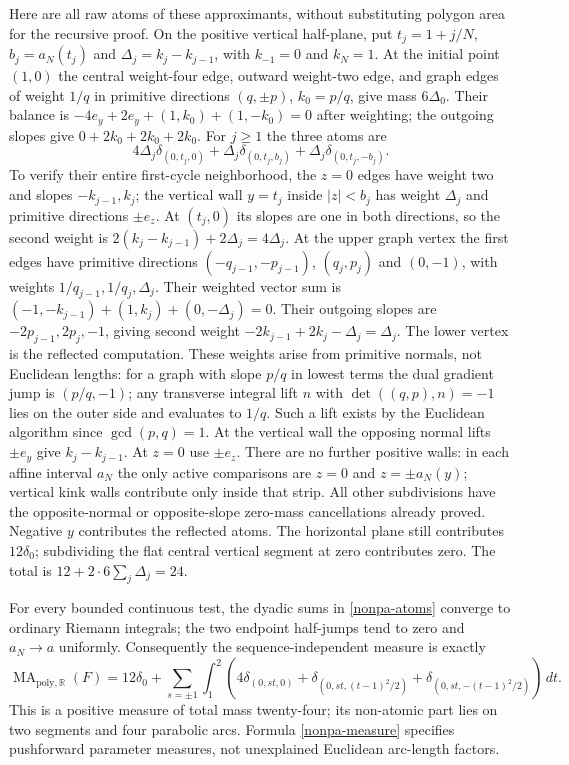 \documentclass[11pt]{article}
\newcommand{\R}{\mathbb R}
\begin{document}
Here are all raw atoms of these approximants, without substituting
polygon area for the recursive proof. On the positive vertical half-plane,
put $t_j=1+j/N$, $b_j=a_N(t_j)$ and $\Delta_j=k_j-k_{j-1}$, with
$k_{-1}=0$ and $k_N=1$.
At the initial point $(1,0)$ the central weight-four edge, outward
weight-two edge, and graph edges of weight $1/q$ in primitive directions
$(q,\pm p)$, $k_0=p/q$, give mass $6\Delta_0$.
Their balance is $-4e_y+2e_y+(1,k_0)+(1,-k_0)=0$ after weighting;
the outgoing slopes give $0+2k_0+2k_0+2k_0$.
For $j\geq1$ the three atoms are
\begin{equation}\label{nonpa-atoms}
 4\Delta_j\delta_{(0,t_j,0)}+
 \Delta_j\delta_{(0,t_j,b_j)}+
 \Delta_j\delta_{(0,t_j,-b_j)}.
\end{equation}
To verify their entire first-cycle neighborhood, the $z=0$ edges have
weight two and slopes $-k_{j-1},k_j$; the vertical wall $y=t_j$ inside
$|z|<b_j$ has weight $\Delta_j$ and primitive directions $\pm e_z$.
At $(t_j,0)$ its slopes are one in both directions, so the second
weight is $2(k_j-k_{j-1})+2\Delta_j=4\Delta_j$.
At the upper graph vertex the first edges have primitive directions
$(-q_{j-1},-p_{j-1})$, $(q_j,p_j)$ and $(0,-1)$, with weights
$1/q_{j-1},1/q_j,\Delta_j$. Their weighted vector sum is
$(-1,-k_{j-1})+(1,k_j)+(0,-\Delta_j)=0$.
Their outgoing slopes are $-2p_{j-1},2p_j,-1$, giving second
weight $-2k_{j-1}+2k_j-\Delta_j=\Delta_j$.
The lower vertex is the reflected computation. These weights arise
from primitive normals, not Euclidean lengths: for a graph with slope
$p/q$ in lowest terms the dual gradient jump is $(p/q,-1)$;
any transverse integral lift $n$ with $\det((q,p),n)=-1$ lies on the
outer side and evaluates to $1/q$. Such a lift exists by the Euclidean
algorithm since $\gcd(p,q)=1$. At the vertical wall the opposing normal
lifts $\pm e_y$ give $k_j-k_{j-1}$. At $z=0$ use $\pm e_z$.
There are no further positive walls: in each affine interval $a_N$
the only active comparisons are $z=0$ and $z=\pm a_N(y)$; vertical
kink walls contribute only inside that strip. All other subdivisions
have the opposite-normal or opposite-slope zero-mass cancellations
already proved. Negative $y$ contributes the reflected atoms. The
horizontal plane still contributes $12\delta_0$; subdividing the flat
central vertical segment at zero contributes zero. The total is
$12+2\cdot6\sum_j\Delta_j=24$.

For every bounded continuous test, the dyadic sums in
\eqref{nonpa-atoms} converge to ordinary Riemann integrals;
the two endpoint half-jumps tend to zero and $a_N\to a$ uniformly.
Consequently the sequence-independent measure is exactly
\begin{equation}\label{nonpa-measure}
 \operatorname{MA}_{\mathrm{poly},\R}(F)=12\delta_0+
 \sum_{s=\pm1}\int_1^2
 \left(4\delta_{(0,st,0)}+
       \delta_{(0,st,(t-1)^2/2)}+
       \delta_{(0,st,-(t-1)^2/2)}\right)\,dt.
\end{equation}
This is a positive measure of total mass twenty-four; its non-atomic
part lies on two segments and four parabolic arcs. Formula
\eqref{nonpa-measure} specifies pushforward parameter measures, not
unexplained Euclidean arc-length factors.
\end{document}
